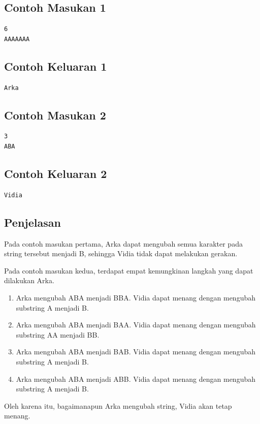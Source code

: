 \documentclass{article}
\begin{document}
\begin{multicols}{2}
\subsection*{Contoh Masukan 1}
\begin{lstlisting}
6
AAAAAAA
\end{lstlisting}
\columnbreak

\subsection*{Contoh Keluaran 1}
\begin{lstlisting}
Arka
\end{lstlisting}
\vfill
\null
\end{multicols}

\begin{multicols}{2}
\subsection*{Contoh Masukan 2}
\begin{lstlisting}
3
ABA
\end{lstlisting}
\columnbreak

\subsection*{Contoh Keluaran 2}
\begin{lstlisting}
Vidia
\end{lstlisting}
\vfill
\null
\end{multicols}

 \subsection*{Penjelasan}
Pada contoh masukan pertama, Arka dapat mengubah semua karakter pada string tersebut menjadi B, sehingga Vidia tidak dapat melakukan gerakan.

Pada contoh masukan kedua, terdapat empat kemungkinan langkah yang dapat dilakukan Arka.
\begin{enumerate}
  \item Arka mengubah ABA menjadi BBA. Vidia dapat menang dengan mengubah substring A menjadi B.
  \item Arka mengubah ABA menjadi BAA. Vidia dapat menang dengan mengubah substring AA menjadi BB.
  \item Arka mengubah ABA menjadi BAB. Vidia dapat menang dengan mengubah substring A menjadi B.
  \item Arka mengubah ABA menjadi ABB. Vidia dapat menang dengan mengubah substring A  menjadi B.
\end{enumerate}
Oleh karena itu, bagaimanapun Arka mengubah string, Vidia akan tetap menang.
\end{document}

